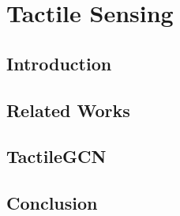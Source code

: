 \chapter{Tactile Sensing}
\label{cha:tactile}

\section{Introduction}
\label{cha:tactile:sec:introduction}

\section{Related Works}
\label{cha:tactile:sec:relatedworks}

\section{TactileGCN}
\label{cha:tactile:sec:tactilegcn}

\section{Conclusion}
\label{cha:tactile:sec:conclusion}
